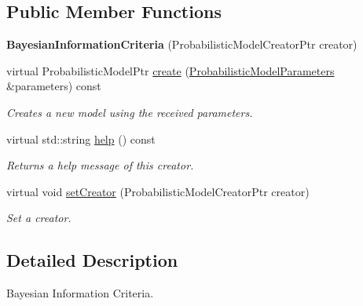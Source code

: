 \subsection*{Public Member Functions}
\begin{DoxyCompactItemize}
\item 
\mbox{\label{classtops_1_1BayesianInformationCriteria_ada34ed0f999f017e91a2b5039e75ed42}} 
{\bfseries Bayesian\+Information\+Criteria} (Probabilistic\+Model\+Creator\+Ptr creator)
\item 
virtual Probabilistic\+Model\+Ptr \hyperlink{classtops_1_1BayesianInformationCriteria_a025c7fff02580703f901376eea7db340}{create} (\hyperlink{classtops_1_1ProbabilisticModelParameters}{Probabilistic\+Model\+Parameters} \&parameters) const
\begin{DoxyCompactList}\small\item\em Creates a new model using the received parameters. \end{DoxyCompactList}\item 
\mbox{\label{classtops_1_1BayesianInformationCriteria_ab420897d48ca999b1f8b236cef896b5b}} 
virtual std\+::string \hyperlink{classtops_1_1BayesianInformationCriteria_ab420897d48ca999b1f8b236cef896b5b}{help} () const
\begin{DoxyCompactList}\small\item\em Returns a help message of this creator. \end{DoxyCompactList}\item 
\mbox{\label{classtops_1_1BayesianInformationCriteria_a941f1105ec71881d8b30125047374467}} 
virtual void \hyperlink{classtops_1_1BayesianInformationCriteria_a941f1105ec71881d8b30125047374467}{set\+Creator} (Probabilistic\+Model\+Creator\+Ptr creator)
\begin{DoxyCompactList}\small\item\em Set a creator. \end{DoxyCompactList}\end{DoxyCompactItemize}


\subsection{Detailed Description}
Bayesian Information Criteria. 

